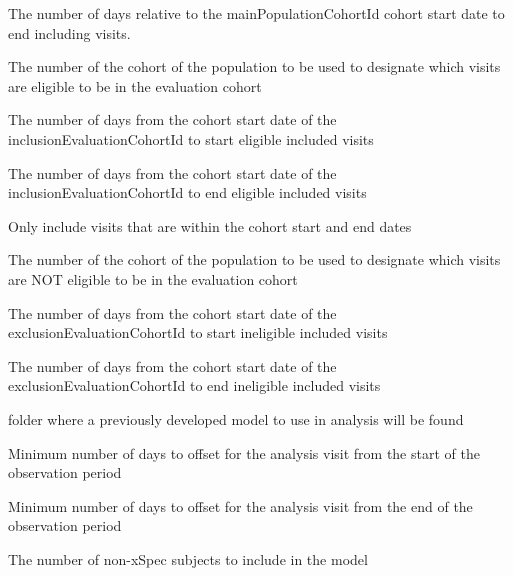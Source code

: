 \documentclass[a4paper]{book}
\begin{document}
\begin{Arguments}
\begin{ldescription}
\item[\code{modelPopulationCohortIdEndDay}] The number of days relative to the mainPopulationCohortId
cohort start date to end including visits.

\item[\code{inclusionEvaluationCohortId}] The number of the cohort of the population to be used to
designate which visits are eligible to be in the
evaluation cohort

\item[\code{inclusionEvaluationDaysFromStart}] The number of days from the cohort start date of the
inclusionEvaluationCohortId to start eligible included
visits

\item[\code{inclusionEvaluationDaysFromEnd}] The number of days from the cohort start date of the
inclusionEvaluationCohortId to end eligible included
visits

\item[\code{duringInclusionEvaluationOnly}] Only include visits that are within the cohort start and
end dates

\item[\code{exclusionEvaluationCohortId}] The number of the cohort of the population to be used to
designate which visits are NOT eligible to be in the
evaluation cohort

\item[\code{exclusionEvaluationDaysFromStart}] The number of days from the cohort start date of the
exclusionEvaluationCohortId to start ineligible included
visits

\item[\code{exclusionEvaluationDaysFromEnd}] The number of days from the cohort start date of the
exclusionEvaluationCohortId to end ineligible included
visits

\item[\code{priorModelToUse}] folder where a previously developed model to use in
analysis will be found

\item[\code{minimumOffsetFromStart}] Minimum number of days to offset for the analysis visit
from the start of the observation period

\item[\code{minimumOffsetFromEnd}] Minimum number of days to offset for the analysis visit
from the end of the observation period

\item[\code{modelBaseSampleSize}] The number of non-xSpec subjects to include in the model


\end{ldescription}
\end{Arguments}
\end{document}
